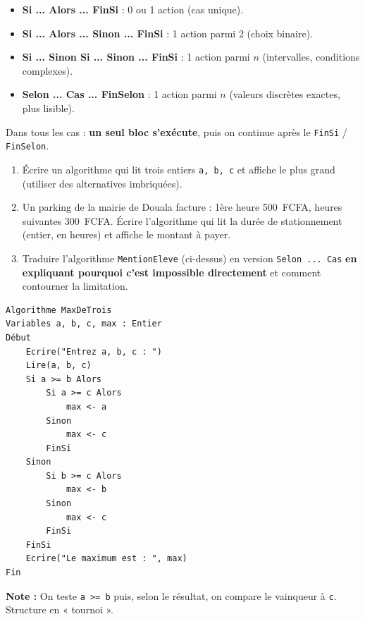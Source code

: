 \documentclass[11pt]{article}
\begin{document}
\begin{aretenir}
\begin{itemize}
    \item \textbf{Si ... Alors ... FinSi} : 0 ou 1 action (cas unique).
    \item \textbf{Si ... Alors ... Sinon ... FinSi} : 1 action parmi 2 (choix binaire).
    \item \textbf{Si ... Sinon Si ... Sinon ... FinSi} : 1 action parmi $n$ (intervalles, conditions complexes).
    \item \textbf{Selon ... Cas ... FinSelon} : 1 action parmi $n$ (valeurs discrètes exactes, plus lisible).
\end{itemize}
Dans tous les cas : \textbf{un seul bloc s'exécute}, puis on continue après le \texttt{FinSi} / \texttt{FinSelon}.
\end{aretenir}

\begin{exercice}
\begin{enumerate}
    \item Écrire un algorithme qui lit trois entiers \texttt{a, b, c} et affiche le plus grand (utiliser des alternatives imbriquées).
    \item Un parking de la mairie de Douala facture : 1ère heure \SI{500}{FCFA}, heures suivantes \SI{300}{FCFA}. Écrire l'algorithme qui lit la durée de stationnement (entier, en heures) et affiche le montant à payer.
    \item Traduire l'algorithme \texttt{MentionEleve} (ci-dessus) en version \texttt{Selon ... Cas} \textbf{en expliquant pourquoi c'est impossible directement} et comment contourner la limitation.
\end{enumerate}
\end{exercice}

\begin{corrige}
\begin{lstlisting}
Algorithme MaxDeTrois
Variables a, b, c, max : Entier
Début
    Ecrire("Entrez a, b, c : ")
    Lire(a, b, c)
    Si a >= b Alors
        Si a >= c Alors
            max <- a
        Sinon
            max <- c
        FinSi
    Sinon
        Si b >= c Alors
            max <- b
        Sinon
            max <- c
        FinSi
    FinSi
    Ecrire("Le maximum est : ", max)
Fin
\end{lstlisting}
\textbf{Note :} On teste \texttt{a >= b} puis, selon le résultat, on compare le vainqueur à \texttt{c}. Structure en « tournoi ».
\end{corrige}
\end{document}
